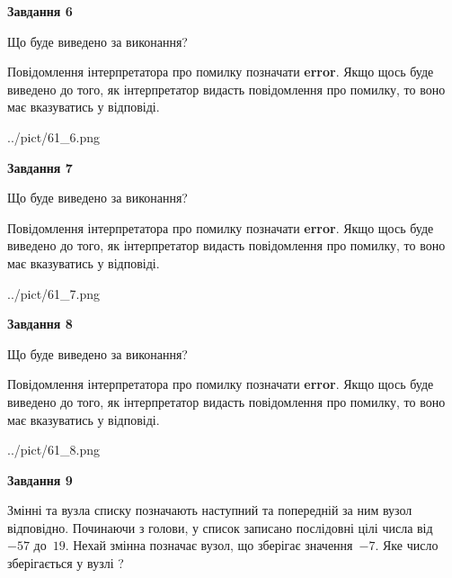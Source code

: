 \documentclass[12pt, ukrainian]{article}
\begin{document}
{\begin {large}
{\begin {center}\textbf{Завдання 6}\end {center}}\par
Що буде виведено за виконання?

Повідомлення інтерпретатора про помилку позначати \textbf{error}.
Якщо щось буде виведено до того, як інтерпретатор видасть повідомлення про помилку, 
то воно має вказуватись у відповіді. \par


\begin{center}
	{../pict/61_6.png}
\end{center}
\newpage

{\begin {center}\textbf{Завдання 7}\end {center}}\par
Що буде виведено за виконання?

Повідомлення інтерпретатора про помилку позначати \textbf{error}.
Якщо щось буде виведено до того, як інтерпретатор видасть повідомлення про помилку, 
то воно має вказуватись у відповіді. \par


\begin{center}
	{../pict/61_7.png}
\end{center}
\newpage

{\begin {center}\textbf{Завдання 8}\end {center}}\par
Що буде виведено за виконання?

Повідомлення інтерпретатора про помилку позначати \textbf{error}.
Якщо щось буде виведено до того, як інтерпретатор видасть повідомлення про помилку, 
то воно має вказуватись у відповіді. \par


\begin{center}
	{../pict/61_8.png}
\end{center}
\newpage

{\begin {center}\textbf{Завдання 9}\end {center}}\par
Змінні  та  вузла списку позначають наступний та попередній за ним вузол відповідно. Починаючи з голови, у список записано послідовні цілі числа від~$-57$ до~$19$. Нехай змінна  позначає вузол, що зберігає значення~$-7$.
Яке число зберігається у вузлі  ?\par
\newpage


\end{large}}
\end{document}
